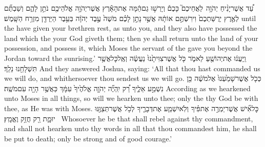 {עַ֠ד אֲשֶׁר\maqqaf יָנִ֨יחַ יְהֹוָ֥ה \pasek  לַאֲחֵיכֶם֮ כָּכֶם֒ וְיָרְשׁ֣וּ גַם\maqqaf הֵ֔מָּה אֶת\maqqaf הָאָ֕רֶץ אֲשֶׁר\maqqaf יְהֹוָ֥ה אֱלֹהֵיכֶ֖ם נֹתֵ֣ן לָהֶ֑ם וְשַׁבְתֶּ֞ם לְאֶ֤רֶץ יְרֻשַּׁתְכֶם֙ וִירִשְׁתֶּ֣ם אוֹתָ֔הּ אֲשֶׁ֣ר \legarmeh  נָתַ֣ן לָכֶ֗ם מֹשֶׁה֙ עֶ֣בֶד יְהֹוָ֔ה בְּעֵ֥בֶר הַיַּרְדֵּ֖ן מִזְרַ֥ח הַשָּֽׁמֶשׁ׃}
{until the \lord\space have given your brethren rest, as unto you, and they also have possessed the land which the \lord\space your God giveth them; then ye shall return unto the land of your possession, and possess it, which Moses the servant of the \lord\space gave you beyond the Jordan toward the sunrising.’}
{וַֽיַּעֲנ֔וּ אֶת\maqqaf יְהוֹשֻׁ֖עַ לֵאמֹ֑ר כֹּ֤ל אֲשֶׁר\maqqaf צִוִּיתָ֙נוּ֙ נַעֲשֶׂ֔ה וְאֶֽל\maqqaf כׇּל\maqqaf אֲשֶׁ֥ר תִּשְׁלָחֵ֖נוּ נֵלֵֽךְ׃}
{And they answered Joshua, saying: ‘All that thou hast commanded us we will do, and whithersoever thou sendest us we will go.}
{כְּכֹ֤ל אֲשֶׁר\maqqaf שָׁמַ֙עְנוּ֙ אֶל\maqqaf מֹשֶׁ֔ה כֵּ֖ן נִשְׁמַ֣ע אֵלֶ֑יךָ רַ֠ק יִֽהְיֶ֞ה יְהֹוָ֤ה אֱלֹהֶ֙יךָ֙ עִמָּ֔ךְ כַּאֲשֶׁ֥ר הָיָ֖ה עִם\maqqaf מֹשֶֽׁה׃}
{According as we hearkened unto Moses in all things, so will we hearken unto thee; only the \lord\space thy God be with thee, as He was with Moses.}
{כׇּל\maqqaf אִ֞ישׁ אֲשֶׁר\maqqaf יַמְרֶ֣ה אֶת\maqqaf פִּ֗יךָ וְלֹֽא\maqqaf יִשְׁמַ֧ע אֶת\maqqaf דְּבָרֶ֛יךָ לְכֹ֥ל אֲשֶׁר\maqqaf תְּצַוֶּ֖נּוּ יוּמָ֑ת רַ֖ק חֲזַ֥ק וֶאֱמָֽץ׃ \petucha }
{Whosoever he be that shall rebel against thy commandment, and shall not hearken unto thy words in all that thou commandest him, he shall be put to death; only be strong and of good courage.’}
